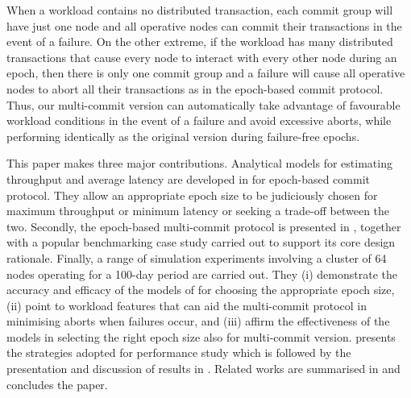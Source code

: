 When a workload contains no distributed transaction, each commit group will have just one node and all operative nodes can commit their transactions in the event of a failure. On the other extreme, if the workload has many distributed transactions that cause every node to interact with every other node during an epoch, then there is only one commit group and a failure will cause all operative nodes to abort all their transactions as in the epoch-based commit protocol. Thus, our multi-commit version can automatically take advantage of favourable workload conditions in the event of a failure and avoid excessive aborts, while performing identically as the original version during failure-free epochs.

This paper makes three major contributions. Analytical models for estimating throughput and average latency are developed in  for epoch-based commit protocol. They allow an appropriate epoch size to be judiciously chosen for maximum throughput or minimum latency or seeking a trade-off between the two. Secondly, the epoch-based multi-commit protocol is presented in , together with a popular benchmarking case study carried out to support its core design rationale. Finally, a range of simulation experiments involving a cluster of 64 nodes operating for a 100-day period are carried out. They (i) demonstrate the accuracy and efficacy of the models of  for choosing the appropriate epoch size, (ii) point to workload features that can aid the multi-commit protocol in minimising aborts when failures occur, and (iii) affirm the effectiveness of the models in selecting the right epoch size  also for multi-commit version.  presents the strategies adopted for performance study which is followed by the presentation and discussion of results in . Related works are summarised in  and  concludes the paper. 

